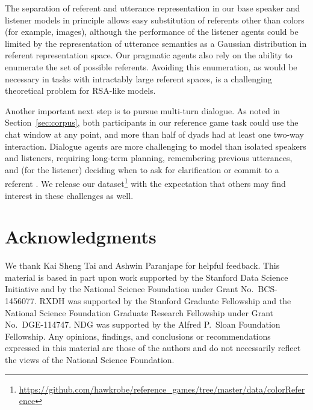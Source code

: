 \documentclass[11pt,letterpaper]{article}
\renewcommand{\|}{\mid}
\newcommand{\secref}[1]{Section~\ref{#1}}
\begin{document}
The separation of referent and utterance representation in our base speaker and
listener models in principle allows easy substitution of referents other than colors
(for example, images), although the performance of the listener agents could be
limited by the representation of utterance semantics as a Gaussian distribution in
referent representation space. Our pragmatic agents also rely on the ability to 
enumerate the set of possible referents. Avoiding this enumeration, as would be 
necessary in tasks with intractably large referent spaces, is a challenging 
theoretical problem for RSA-like models.

Another important next step is to pursue
multi-turn dialogue. As noted in \secref{sec:corpus},
both participants in our reference game task could use the chat window
at any point, and more than half of dyads
had at least one two-way interaction. Dialogue agents are more
challenging to model than isolated speakers and listeners,
requiring long-term planning, remembering previous utterances, and
(for the listener) deciding when to ask for clarification or commit to a referent
\cite{Lewis79_Scorekeeping,BrownYule83_Discourse,Clark96,Roberts96_InformationStructureDiscourse}.
We release our
dataset\footnote{\label{foot:release}\url{https://github.com/hawkrobe/reference_games/tree/master/data/colorReference}}
with the expectation that others may find interest in these challenges as well.


\section*{Acknowledgments}

We thank Kai Sheng Tai and Ashwin Paranjape for helpful feedback.
This material is based in part upon work supported by the 
Stanford Data Science Initiative and by the National Science Foundation
under Grant No.\ BCS-1456077.
RXDH was supported by the Stanford Graduate Fellowship and the
National Science Foundation Graduate Research Fellowship under Grant No.\ DGE-114747.
NDG was supported by the Alfred P.\ Sloan Foundation Fellowship.
Any opinions, findings, and conclusions or recommendations 
expressed in this material are those of the authors and do not necessarily
reflect the views of the National Science Foundation.
\end{document}
